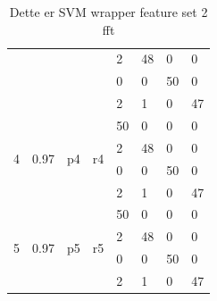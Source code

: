 \documentclass[USenglish]{ifimaster}  %
\begin{document}
\begin{table}[h]
{\begin{tabular}{@{}llllllll@{}}
\multicolumn{1}{l|}{} & \multicolumn{1}{l|}{} & \multicolumn{1}{l|}{} & \multicolumn{1}{l|}{} & \multicolumn{1}{l|}{2} & \multicolumn{1}{l|}{48} & \multicolumn{1}{l|}{0} & 0 \\ \cmidrule(l){5-8} 
\multicolumn{1}{l|}{} & \multicolumn{1}{l|}{} & \multicolumn{1}{l|}{} & \multicolumn{1}{l|}{} & \multicolumn{1}{l|}{0} & \multicolumn{1}{l|}{0} & \multicolumn{1}{l|}{50} & 0 \\ \cmidrule(l){5-8} 
\multicolumn{1}{l|}{} & \multicolumn{1}{l|}{} & \multicolumn{1}{l|}{} & \multicolumn{1}{l|}{} & \multicolumn{1}{l|}{2} & \multicolumn{1}{l|}{1} & \multicolumn{1}{l|}{0} & 47 \\ \midrule
\multicolumn{1}{l|}{\multirow{4}{*}{4}} & \multicolumn{1}{l|}{\multirow{4}{*}{0.97}} & \multicolumn{1}{l|}{\multirow{4}{*}{p4}} & \multicolumn{1}{l|}{\multirow{4}{*}{r4}} & \multicolumn{1}{l|}{50} & \multicolumn{1}{l|}{0} & \multicolumn{1}{l|}{0} & 0 \\ \cmidrule(l){5-8} 
\multicolumn{1}{l|}{} & \multicolumn{1}{l|}{} & \multicolumn{1}{l|}{} & \multicolumn{1}{l|}{} & \multicolumn{1}{l|}{2} & \multicolumn{1}{l|}{48} & \multicolumn{1}{l|}{0} & 0 \\ \cmidrule(l){5-8} 
\multicolumn{1}{l|}{} & \multicolumn{1}{l|}{} & \multicolumn{1}{l|}{} & \multicolumn{1}{l|}{} & \multicolumn{1}{l|}{0} & \multicolumn{1}{l|}{0} & \multicolumn{1}{l|}{50} & 0 \\ \cmidrule(l){5-8} 
\multicolumn{1}{l|}{} & \multicolumn{1}{l|}{} & \multicolumn{1}{l|}{} & \multicolumn{1}{l|}{} & \multicolumn{1}{l|}{2} & \multicolumn{1}{l|}{1} & \multicolumn{1}{l|}{0} & 47 \\ \midrule
\multicolumn{1}{l|}{\multirow{4}{*}{5}} & \multicolumn{1}{l|}{\multirow{4}{*}{0.97}} & \multicolumn{1}{l|}{\multirow{4}{*}{p5}} & \multicolumn{1}{l|}{\multirow{4}{*}{r5}} & \multicolumn{1}{l|}{50} & \multicolumn{1}{l|}{0} & \multicolumn{1}{l|}{0} & 0 \\ \cmidrule(l){5-8} 
\multicolumn{1}{l|}{} & \multicolumn{1}{l|}{} & \multicolumn{1}{l|}{} & \multicolumn{1}{l|}{} & \multicolumn{1}{l|}{2} & \multicolumn{1}{l|}{48} & \multicolumn{1}{l|}{0} & 0 \\ \cmidrule(l){5-8} 
\multicolumn{1}{l|}{} & \multicolumn{1}{l|}{} & \multicolumn{1}{l|}{} & \multicolumn{1}{l|}{} & \multicolumn{1}{l|}{0} & \multicolumn{1}{l|}{0} & \multicolumn{1}{l|}{50} & 0 \\ \cmidrule(l){5-8} 
\multicolumn{1}{l|}{} & \multicolumn{1}{l|}{} & \multicolumn{1}{l|}{} & \multicolumn{1}{l|}{} & \multicolumn{1}{l|}{2} & \multicolumn{1}{l|}{1} & \multicolumn{1}{l|}{0} & 47 \\ \bottomrule
\end{tabular}%
}
\caption{Dette er SVM wrapper feature set 2 fft}
\label{svm1}
\end{table}
\FloatBarrier
\end{document}
